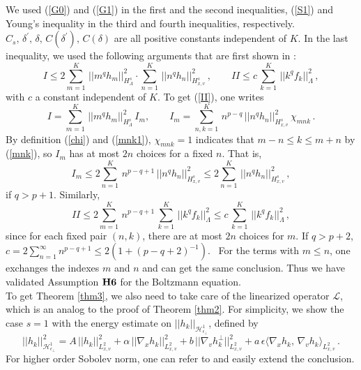 \documentclass[final,onefignum,onetabnum]{siamart171218}
\begin{document}
We used (\ref{G0}) and (\ref{G1}) in the first and the second inequalities, (\ref{S1}) and Young's inequality in the third and fourth inequalities, respectively.
$C_s, \, \delta^{\prime}, \, \delta, \, C(\delta^{\prime}), \, C(\delta)$ are all positive constants independent of $K$.
In the last inequality, we used the following arguments that are first shown in \cite{Rui}:
\begin{equation}\label{II} I \leq 2 \sum_{m=1}^K\, ||m^q h_m||_{H_{\Lambda}^s}^2 \cdot \sum_{n=1}^K\, ||n^q h_n||_{H_{x,v}^s}^2\,, \qquad
II \leq c\, \sum_{k=1}^K\, ||k^q f_k||_{\Lambda}^2\,, \end{equation}
with $c$ a constant independent of $K$.
To get (\ref{II}), one writes $$I=\sum_{m=1}^{K}\, ||m^q h_m||_{H_{\Lambda}^s}^2\, I_m, \qquad
I_m= \sum_{n,k=1}^{K}\, n^{p-q}\, ||n^{q}h_n||_{H^s_{x,v}}^2\, \chi_{mnk}\,.$$
By definition (\ref{chi}) and (\ref{mnk1}), $\chi_{mnk}=1$ indicates that $m-n\leq k\leq m+n$ by (\ref{mnk}), so $I_{m}$ has at most $2n$ choices for a fixed $n$. That is,
$$I_m\leq 2\sum_{n=1}^{K}\, n^{p-q+1}\, ||n^q h_n||_{H^s_{x,v}}^2 \leq 2 \sum_{n=1}^{K}\,  ||n^q h_n||_{H^s_{x,v}}^2\,,$$
if $q>p+1$. Similarly, $$II\leq 2\sum_{m=1}^{K}\, n^{p-q+1}\, \sum_{k=1}^{K}\, ||k^q f_k||_{\Lambda}^2\leq c\, \sum_{k=1}^K\, ||k^q f_k||_{\Lambda}^2\,,$$
since for each fixed pair $(n,k)$, there are at most $2n$ choices for $m$. If $q>p+2$, $c=2\sum_{n=1}^{\infty} n^{p-q+1}
\leq 2 (1+(p-q+2)^{-1})$. \,
For the terms with $m\leq n$, one exchanges the indexes $m$ and $n$ and can get the same conclusion. Thus we have validated Assumption ${\bf H6}$
for the Boltzmann equation. \\[2pt]

To get Theorem \ref{thm3}, we also need to take care of the linearized operator $\mathcal L$, which is an analog to the proof of Theorem \ref{thm2}.
For simplicity, we show the case $s=1$ with the energy estimate on $||h_k||_{\mathcal H_{\epsilon_{\perp}}^1}$, defined by
$$ ||h_k||_{\mathcal H_{\epsilon_{\perp}}^1}^2 = A\, ||h_k||_{L^2_{x,v}}^2 + \alpha\, ||\nabla_x h_k||_{L^2_{x,v}}^2 + b\, ||\nabla_v h_k^{\perp}||_{L^2_{x,v}}^2
+ a\, \epsilon \langle\nabla_x h_k, \,\nabla_v h_k\rangle_{L^2_{x,v}}\,.$$
For higher order Sobolev norm, one can refer to \cite{MB} and easily extend the conclusion.
\end{document}
